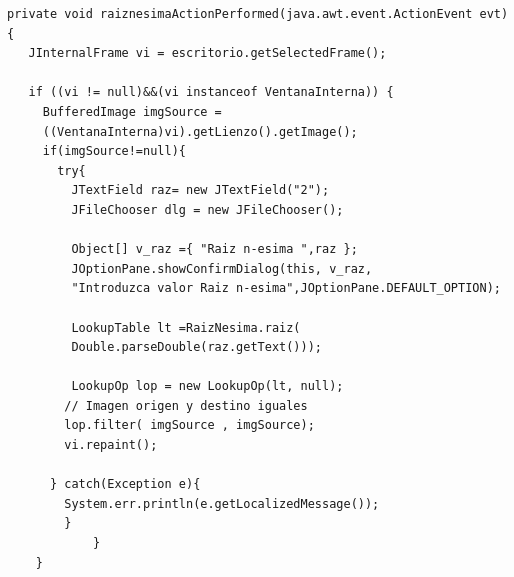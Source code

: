 \begin{lstlisting}
private void raiznesimaActionPerformed(java.awt.event.ActionEvent evt) {
   JInternalFrame vi = escritorio.getSelectedFrame();

   if ((vi != null)&&(vi instanceof VentanaInterna)) {
     BufferedImage imgSource = 
     ((VentanaInterna)vi).getLienzo().getImage();
     if(imgSource!=null){
       try{
         JTextField raz= new JTextField("2");
         JFileChooser dlg = new JFileChooser();        

         Object[] v_raz ={ "Raiz n-esima ",raz };
         JOptionPane.showConfirmDialog(this, v_raz,
         "Introduzca valor Raiz n-esima",JOptionPane.DEFAULT_OPTION);

         LookupTable lt =RaizNesima.raiz(
         Double.parseDouble(raz.getText()));
                 
         LookupOp lop = new LookupOp(lt, null);
        // Imagen origen y destino iguales
        lop.filter( imgSource , imgSource);
        vi.repaint();
                    
      } catch(Exception e){
        System.err.println(e.getLocalizedMessage());
        }
            }
    }


\end{lstlisting}


